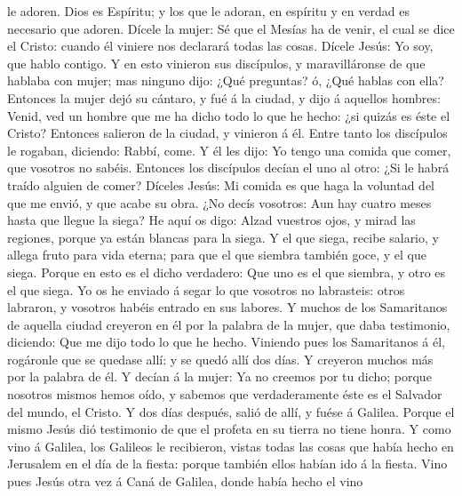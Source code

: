 le adoren.  Dios es Espíritu; y los que le adoran, en
espíritu y en verdad es necesario que adoren.  Dícele la
mujer: Sé que el Mesías ha de venir, el cual se dice el Cristo: cuando
él viniere nos declarará todas las cosas.  Dícele Jesús:
Yo soy, que hablo contigo.  Y en esto vinieron sus
discípulos, y maravilláronse de que hablaba con mujer; mas ninguno dijo:
¿Qué preguntas? ó, ¿Qué hablas con ella?  Entonces la
mujer dejó su cántaro, y fué á la ciudad, y dijo á aquellos hombres:
 Venid, ved un hombre que me ha dicho todo lo que he
hecho: ¿si quizás es éste el Cristo?  Entonces salieron
de la ciudad, y vinieron á él.  Entre tanto los
discípulos le rogaban, diciendo: Rabbí, come.  Y él les
dijo: Yo tengo una comida que comer, que vosotros no sabéis.
 Entonces los discípulos decían el uno al otro: ¿Si le
habrá traído alguien de comer?  Díceles Jesús: Mi comida
es que haga la voluntad del que me envió, y que acabe su obra.
 ¿No decís vosotros: Aun hay cuatro meses hasta que
llegue la siega? He aquí os digo: Alzad vuestros ojos, y mirad las
regiones, porque ya están blancas para la siega.  Y el
que siega, recibe salario, y allega fruto para vida eterna; para que el
que siembra también goce, y el que siega.  Porque en esto
es el dicho verdadero: Que uno es el que siembra, y otro es el que
siega.  Yo os he enviado á segar lo que vosotros no
labrasteis: otros labraron, y vosotros habéis entrado en sus labores.
 Y muchos de los Samaritanos de aquella ciudad creyeron
en él por la palabra de la mujer, que daba testimonio, diciendo: Que me
dijo todo lo que he hecho.  Viniendo pues los Samaritanos
á él, rogáronle que se quedase allí: y se quedó allí dos días.
 Y creyeron muchos más por la palabra de él.
 Y decían á la mujer: Ya no creemos por tu dicho; porque
nosotros mismos hemos oído, y sabemos que verdaderamente éste es el
Salvador del mundo, el Cristo.  Y dos días después, salió
de allí, y fuése á Galilea.  Porque el mismo Jesús dió
testimonio de que el profeta en su tierra no tiene honra.
 Y como vino á Galilea, los Galileos le recibieron,
vistas todas las cosas que había hecho en Jerusalem en el día de la
fiesta: porque también ellos habían ido á la fiesta. 
Vino pues Jesús otra vez á Caná de Galilea, donde había hecho el vino
